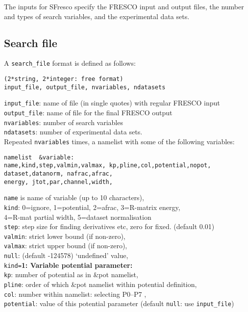 \documentclass[11pt]{article}
\begin{document}
The inputs for {\sc SFresco} specify the FRESCO input and output files,
the number and types of search variables, and the experimental data sets.

\subsection{Search file}
A {\tt search\_file} format is defined as follows:
\begin{verbatim}
(2*string, 2*integer: free format)
input_file, output_file, nvariables, ndatasets
\end{verbatim}
\smallskip

{\tt input\_file}: name of file (in single quotes) with regular FRESCO input\\
{\tt output\_file}: name of file for the final FRESCO output\\
{\tt nvariables}: number of search variables\\
{\tt ndatasets}:  number of experimental data sets.\\

Repeated {\tt nvariables} times, a namelist with some of the following variables:
\begin{verbatim}
namelist  &variable:
name,kind,step,valmin,valmax, kp,pline,col,potential,nopot,
dataset,datanorm, nafrac,afrac,
energy, jtot,par,channel,width,
\end{verbatim}
{\tt name} is name of variable (up to 10 characters),\\
{\tt kind}: 0=ignore, 1=potential, 2=afrac, 3=R-matrix energy,\\
   \hspace*{10mm} 4=R-mat partial width, 5=dataset normalisation\\
{\tt step}: step size for finding derivatives etc, zero for fixed. (default 0.01)\\
{\tt valmin}: strict lower bound (if non-zero),\\
{\tt valmax}: strict upper bound (if non-zero), \\
{\tt null}: (default -124578) `undefined' value,\\

{\tt kind=}{\bf 1: Variable potential parameter:}\\
{\tt kp}: number of potential as in \&pot namelist,\\
{\tt pline}: order of which \&pot namelist within potential definition,\\
{\tt col}:   number within namelist: selecting P0--P7 ,\\
{\tt potential}: value of this potential parameter (default {\tt null}: use {\tt input\_file})\\
\end{document}
